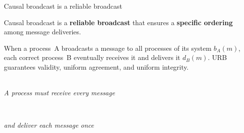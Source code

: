 \documentclass[10pt, xcolor={usenames, dvipsnames}]{beamer}
\begin{document}
\begin{frame}{Causal broadcast is a reliable broadcast}

  Causal broadcast is a \textbf{reliable broadcast} that ensures a
  \textbf{specific ordering} among message deliveries.
  
  \vspace{1em}

  \begin{definition} 
    When a process~A broadcasts a message to all processes of its system $b_A(m)$,
    each correct process~B eventually receives it and delivers it
    $d_B(m)$. URB guarantees validity, uniform agreement, and uniform integrity.
  \end{definition}

  \begin{minipage}{0.49\textwidth} %
      \\
      \small\textit{A process must receive every message}
  \end{minipage}~~~
  \begin{minipage}{0.49\textwidth} %
    \begin{center}
      
      \small\textit{and deliver each message once}
    \end{center}
  \end{minipage}
  
  

  
\end{frame}
\end{document}
